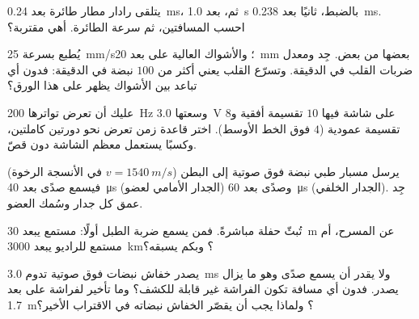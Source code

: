 \begin{exercise}[$\star\star$]\label{exo:g10:signals-and-waves:7}
يتلقى رادار مطار  طائرة بعد \qty{0.24}{ms}، ثم، بعد
\qty{1.0}{s} بالضبط،  ثانيًا بعد \qty{0.238}{ms}. احسب
المسافتين، ثم سرعة الطائرة. أهي مقتربة؟
\end{exercise}

\begin{exercise}[$\star\star$]\label{exo:g10:signals-and-waves:8}
يُطبع  بسرعة \qty{25}{mm/s}؛ والأشواك العالية على بعد \qty{20}{mm}
بعضها من بعض. جِد  ومعدل ضربات القلب في الدقيقة.
وتسرّع القلب يعني أكثر من $100$ نبضة في الدقيقة: فدون أي تباعد بين الأشواك
يظهر على هذا الورق؟
\end{exercise}

\begin{exercise}[$\star\star$]\label{exo:g10:signals-and-waves:9}
عليك أن تعرض  تواترها \qty{200}{Hz} وسعتها \qty{3.0}{V} على
شاشة فيها $10$ تقسيمة أفقية و$8$ تقسيمة عمودية ($4$ فوق
الخط الأوسط). اختر قاعدة زمن تعرض نحو دورتين كاملتين، وكسبًا
يستعمل معظم الشاشة دون قصّ.
\end{exercise}

\begin{exercise}[$\star\star$]\label{exo:g10:signals-and-waves:10}
يرسل مسبار طبي نبضة فوق صوتية إلى البطن
($v = \qty{1540}{m/s}$ في الأنسجة الرخوة) فيسمع صدًى بعد
\qty{40}{\micro s} (الجدار الأمامي لعضو) وصدًى بعد \qty{60}{\micro s} (الجدار
الخلفي). جِد عمق كل جدار وسُمك العضو.
\end{exercise}

\begin{exercise}[$\star\star$]\label{exo:g10:signals-and-waves:11}
تُبثّ حفلة مباشرةً. فمن يسمع ضربة الطبل أولًا: مستمع
يبعد \qty{30}{m} عن المسرح، أم مستمع للراديو يبعد \qty{3000}{km}؟ وبكم
يسبقه؟
\end{exercise}

\begin{exercise}[$\star\star\star$]\label{exo:g10:signals-and-waves:12}
يصدر خفاش نبضات فوق صوتية تدوم \qty{3.0}{ms} ولا يقدر أن يسمع
صدًى وهو ما يزال يصدر. فدون أي مسافة تكون الفراشة
غير قابلة للكشف؟ وما تأخير  لفراشة على بعد \qty{1.7}{m}؟ ولماذا
يجب أن يقصّر الخفاش نبضاته في الاقتراب الأخير؟
\end{exercise}

